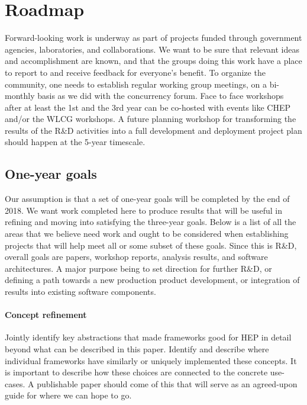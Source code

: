 \documentclass[12pt,a4paper]{article}
\begin{document}
\section{Roadmap}
\label{sec:roadmap}
Forward-looking work is underway as part of projects funded through government agencies, laboratories, and collaborations.  We want to be sure that relevant ideas and accomplishment are known, and that the groups doing this work have a place to report to and receive feedback for everyone’s benefit.
To organize the community, one needs to establish regular working group meetings, on a bi-monthly basis as we did with the concurrency forum. Face to face workshops after at least the 1st and the 3rd year can be co-hosted with events like CHEP and/or the WLCG workshops. A future planning workshop for transforming the results of the R\&D activities into a full development and deployment project plan should happen at the 5-year timescale.

\subsection{One-year goals}
\label{sec:one-year-goals}

Our assumption is that a set of one-year goals will be completed by
the end of 2018. We want work completed here to produce results that
will be useful in refining and moving into satisfying the three-year
goals.  Below is a list of all the areas that we believe need work and
ought to be considered when establishing projects that will help meet
all or some subset of these goals. Since this is R\&D, overall goals
are papers, workshop reports, analysis results, and software
architectures. A major purpose being to set direction for further
R\&D, or defining a path towards a new production product development,
or integration of results into existing software components.

\paragraph{Concept refinement} Jointly identify key abstractions that
made frameworks good for HEP in detail beyond what can be described in
this paper. Identify and describe where individual frameworks have
similarly or uniquely implemented these concepts. It is important to
describe how these choices are connected to the concrete use-cases. A
publishable paper should come of this that will serve as an agreed-upon
guide for where we can hope to go.
\end{document}
